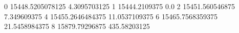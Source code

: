 0 15448.5205078125 4.3095703125
1 15444.2109375 0.0
2 15451.560546875 7.349609375
4 15455.2646484375 11.0537109375
6 15465.7568359375 21.5458984375
8 15879.79296875 435.58203125
